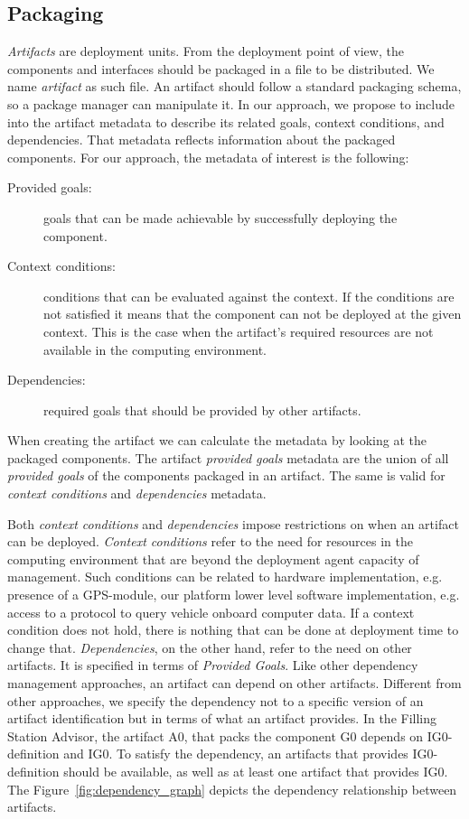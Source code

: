 \subsection{Packaging}
\label{sec_artifacts}
\emph{Artifacts} are deployment units.
From the deployment point of view, the components and interfaces should be packaged in a file to be distributed. We name \emph{artifact} as such file.
An artifact should follow a standard packaging schema, so a package manager can manipulate it.
In our approach, we propose to include into the artifact metadata to describe its related goals, context conditions, and dependencies. That metadata reflects information about the packaged components. For our approach, the metadata of interest is the following:

\begin{description}
  \item[Provided goals:] goals that can be made achievable by successfully deploying the component.
  \item[Context conditions:] conditions that can be evaluated against the context. If the conditions are not satisfied it means that the component can not be deployed at the given context. This is the case when the artifact's required resources are not available in the computing environment.
  \item[Dependencies:] required goals that should be provided by other artifacts.
\end{description}

When creating the artifact we can calculate the metadata by looking at the packaged components. The artifact \emph{provided goals} metadata are the union of all \emph{provided goals} of the components packaged in an artifact. The same is valid for \emph{context conditions} and \emph{dependencies} metadata.

Both \emph{context conditions} and \emph{dependencies} impose restrictions on when an artifact can be deployed.
\emph{Context conditions} refer to the need for resources in the computing environment that are beyond the deployment agent capacity of management. Such conditions can be related to hardware implementation, e.g. presence of a GPS-module, our platform lower level software implementation, e.g. access to a protocol to query vehicle onboard computer data. If a context condition does not hold, there is nothing that can be done at deployment time to change that.
\emph{Dependencies}, on the other hand, refer to the need on other artifacts. It is specified in terms of \emph{Provided Goals}. Like other dependency management approaches, an artifact can depend on other artifacts.
Different from other approaches, we specify the dependency not to a specific version of an artifact identification but in terms of what an artifact provides.
In the Filling Station Advisor, the artifact A0, that packs the component G0 depends on IG0-definition and IG0. To satisfy the dependency, an artifacts that provides IG0-definition should be available, as well as at least one artifact that provides IG0. The Figure~\ref{fig:dependency_graph} depicts the dependency relationship between artifacts.

